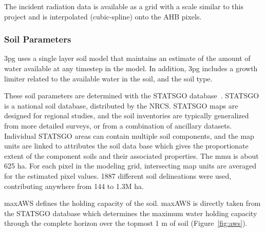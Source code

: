 \documentclass[preprint,review,12pt]{elsarticle}
\begin{document}
The incident radiation data is available as a grid with a scale
similar to this project and is interpolated (cubic-spline) onto the
\ac{AHB} pixels.

\subsubsection{Soil Parameters}
\label{sec:soil}

\ac{3pg} uses a single layer soil model that maintains an estimate of
the amount of water available at any timestep in the model.  In
addition, \ac{3pg} includes a growth limiter related to the available
water in the soil, and the soil type.

These soil parameters are determined with the \acf{STATSGO}
database~\cite{STATSGO}.  \ac{STATSGO} is a national soil database,
distributed by the \ac{NRCS}.  \ac{STATSGO} maps are designed for
regional studies, and the soil inventories are typically generalized
from more detailed surveys, or from a combination of ancillary
datasets.  Individual \ac{STATSGO} areas can contain multiple soil
components, and the map units are linked to attributes the soil data
base which gives the proportionate extent of the component soils and
their associated properties.  The \ac{mmu} is about 625 ha.  For
each pixel in the modeling grid, intersecting map units are averaged
for the estimated pixel values.  1887 different soil delineations were
used, contributing anywhere from 144 to 1.3M ha.

\ac{maxAWS} defines the holding capacity of the soil.
\ac{maxAWS} is directly taken from the \ac{STATSGO} database which
determines the maximum water holding capacity through the complete
horizon over the topmost 1 m of soil (Figure~\ref{fig:aws}).
\end{document}
